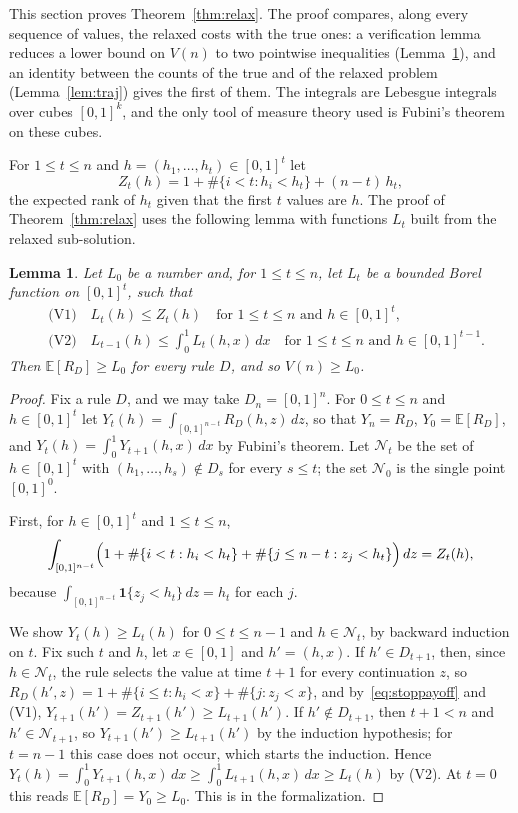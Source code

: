 \documentclass[11pt]{amsart}
\newtheorem{lemma}[theorem]{Lemma}
\theoremstyle{definition}
\numberwithin{equation}{section}
\newcommand{\lean}[1]{\ignorespaces}
\newcommand{\E}{\mathbb{E}}
\newcommand{\one}{\mathbf{1}}
\begin{document}
This section proves Theorem~\ref{thm:relax}. The proof compares, along every sequence of values, the relaxed costs with the true ones: a verification lemma reduces a lower bound on $V(n)$ to two pointwise inequalities (Lemma~\ref{lem:verif}), and an identity between the counts of the true and of the relaxed problem (Lemma~\ref{lem:traj}) gives the first of them. The integrals are Lebesgue integrals over cubes $[0,1]^k$, and the only tool of measure theory used is Fubini's theorem on these cubes.

For $1\le t\le n$ and $h=(h_1,\dots,h_t)\in[0,1]^t$ let
\[
Z_t(h)=1+\#\{i<t: h_i<h_t\}+(n-t)\,h_t,
\]
the expected rank of $h_t$ given that the first $t$ values are $h$. The proof of Theorem~\ref{thm:relax} uses the following lemma with functions $L_t$ built from the relaxed sub-solution.

\begin{lemma}\label{lem:verif}\lean{Robbins.le_v_of_verification, Robbins.Rule.expectedRank_ge_of_verification}
Let $L_0$ be a number and, for $1\le t\le n$, let $L_t$ be a bounded Borel function on $[0,1]^t$, such that
\begin{align*}
&\text{(V1)}\quad L_t(h)\le Z_t(h)\quad\text{for } 1\le t\le n \text{ and } h\in[0,1]^t,\\
&\text{(V2)}\quad L_{t-1}(h)\le\int_0^1 L_t(h,x)\,dx\quad\text{for } 1\le t\le n\text{ and } h\in[0,1]^{t-1}.
\end{align*}
Then $\E[R_D]\ge L_0$ for every rule $D$, and so $V(n)\ge L_0$.
\end{lemma}

\begin{proof}
Fix a rule $D$, and we may take $D_n=[0,1]^n$. For $0\le t\le n$ and $h\in[0,1]^t$ let $Y_t(h)=\int_{[0,1]^{n-t}}R_D(h,z)\,dz$, so that $Y_n=R_D$, $Y_0=\E[R_D]$, and $Y_t(h)=\int_0^1Y_{t+1}(h,x)\,dx$ by Fubini's theorem. Let $\mathcal N_t$ be the set of $h\in[0,1]^t$ with $(h_1,\dots,h_s)\notin D_s$ for every $s\le t$; the set $\mathcal N_0$ is the single point $[0,1]^0$.

First, for $h\in[0,1]^t$ and $1\le t\le n$,
\begin{equation}\label{eq:stoppayoff}
\int_{[0,1]^{n-t}}\Bigl(1+\#\{i<t:h_i<h_t\}+\#\{j\le n-t: z_j<h_t\}\Bigr)\,dz=Z_t(h),
\end{equation}
because $\int_{[0,1]^{n-t}}\one\{z_j<h_t\}\,dz=h_t$ for each $j$.

We show $Y_t(h)\ge L_t(h)$ for $0\le t\le n-1$ and $h\in \mathcal N_t$, by backward induction on $t$. Fix such $t$ and $h$, let $x\in[0,1]$ and $h'=(h,x)$. If $h'\in D_{t+1}$, then, since $h\in \mathcal N_t$, the rule selects the value at time $t+1$ for every continuation $z$, so $R_D(h',z)=1+\#\{i\le t: h_i<x\}+\#\{j: z_j<x\}$, and by~\eqref{eq:stoppayoff} and (V1), $Y_{t+1}(h')=Z_{t+1}(h')\ge L_{t+1}(h')$. If $h'\notin D_{t+1}$, then $t+1<n$ and $h'\in \mathcal N_{t+1}$, so $Y_{t+1}(h')\ge L_{t+1}(h')$ by the induction hypothesis; for $t=n-1$ this case does not occur, which starts the induction. Hence $Y_t(h)=\int_0^1Y_{t+1}(h,x)\,dx\ge\int_0^1L_{t+1}(h,x)\,dx\ge L_t(h)$ by (V2). At $t=0$ this reads $\E[R_D]=Y_0\ge L_0$. This is  in the formalization.
\end{proof}
\end{document}
